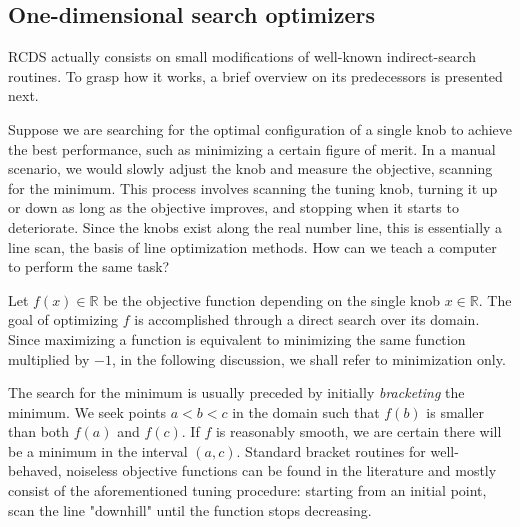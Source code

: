 \subsection{One-dimensional search optimizers}
RCDS actually consists on small modifications of well-known indirect-search routines. To grasp how it works, a brief overview on its predecessors is presented next.

Suppose we are searching for the optimal configuration of a single knob to achieve the best performance, such as minimizing a certain figure of merit. In a manual scenario, we would slowly adjust the knob and measure the objective, scanning for the minimum. This process involves scanning the tuning knob, turning it up or down as long as the objective improves, and stopping when it starts to deteriorate. Since the knobs exist along the real number line, this is essentially a line scan, the basis of line optimization methods. How can we teach a computer to perform the same task?

Let $f(x)\in\mathbb{R}$ be the objective function depending on the single knob $x\in\mathbb{R}$. The goal of optimizing $f$ is accomplished through a direct search over its domain. Since maximizing a function is equivalent to minimizing the same function multiplied by $-1$, in the following discussion, we shall refer to minimization only.

The search for the minimum is usually preceded by initially \textit{bracketing} the minimum. We seek points $a < b < c$ in the domain such that $f(b)$ is smaller than both $f(a)$ and $f(c)$. If $f$ is reasonably smooth, we are certain there will be a minimum in the interval $(a, c)$. Standard bracket routines for well-behaved, noiseless objective functions can be found in the literature \cite[section 10.1]{press_numerical_2007} and mostly consist of the aforementioned tuning procedure: starting from an initial point, scan the line "downhill" until the function stops decreasing.


